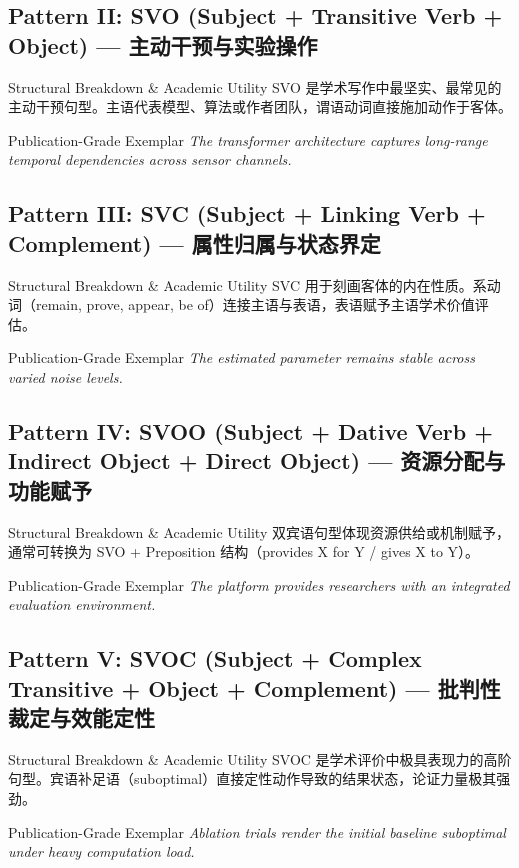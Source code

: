 \subsection{Pattern II: SVO (Subject + Transitive Verb + Object) --- 主动干预与实验操作}
\begin{ConceptBox}{Structural Breakdown \& Academic Utility}
SVO 是学术写作中最坚实、最常见的主动干预句型。主语代表模型、算法或作者团队，谓语动词直接施加动作于客体。
\end{ConceptBox}
\begin{ExampleBox}{Publication-Grade Exemplar}
\textit{The transformer architecture captures long-range temporal dependencies across sensor channels.}
\end{ExampleBox}
\vspace{4pt}
\subsection{Pattern III: SVC (Subject + Linking Verb + Complement) --- 属性归属与状态界定}
\begin{ConceptBox}{Structural Breakdown \& Academic Utility}
SVC 用于刻画客体的内在性质。系动词（remain, prove, appear, be of）连接主语与表语，表语赋予主语学术价值评估。
\end{ConceptBox}
\begin{ExampleBox}{Publication-Grade Exemplar}
\textit{The estimated parameter remains stable across varied noise levels.}
\end{ExampleBox}
\vspace{4pt}
\subsection{Pattern IV: SVOO (Subject + Dative Verb + Indirect Object + Direct Object) --- 资源分配与功能赋予}
\begin{ConceptBox}{Structural Breakdown \& Academic Utility}
双宾语句型体现资源供给或机制赋予，通常可转换为 SVO + Preposition 结构（provides X for Y / gives X to Y）。
\end{ConceptBox}
\begin{ExampleBox}{Publication-Grade Exemplar}
\textit{The platform provides researchers with an integrated evaluation environment.}
\end{ExampleBox}
\vspace{4pt}
\subsection{Pattern V: SVOC (Subject + Complex Transitive + Object + Complement) --- 批判性裁定与效能定性}
\begin{ConceptBox}{Structural Breakdown \& Academic Utility}
SVOC 是学术评价中极具表现力的高阶句型。宾语补足语（suboptimal）直接定性动作导致的结果状态，论证力量极其强劲。
\end{ConceptBox}
\begin{ExampleBox}{Publication-Grade Exemplar}
\textit{Ablation trials render the initial baseline suboptimal under heavy computation load.}
\end{ExampleBox}
\vspace{4pt}

